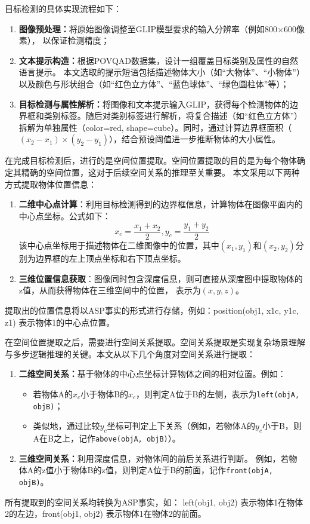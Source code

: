 目标检测的具体实现流程如下：
\begin{enumerate}[nosep] 
\item \textbf{图像预处理：}将原始图像调整至GLIP模型要求的输入分辨率（例如800$\times$600像素），
以保证检测精度； 
\item \textbf{文本提示构造：}根据POVQAD数据集，设计一组覆盖目标类别及属性的自然语言提示。
本文选取的提示短语包括描述物体大小（如“大物体”、“小物体”）以及颜色与形状组合（如“红色立方体”、“蓝色球体”、“绿色圆柱体”等）； 
\item \textbf{目标检测与属性解析：}将图像和文本提示输入GLIP，获得每个检测物体的边界框和类别标签。随后对类别标签进行解析，将复合描述（如“红色立方体”）拆解为单独属性（color=red, shape=cube）。同时，通过计算边界框面积（$(x_2 - x_1)\times(y_2 - y_1)$），结合预设阈值进一步推断物体的大小属性。 
\end{enumerate}

在完成目标检测后，进行的是空间位置提取。空间位置提取的目的是为每个物体确定其精确的空间位置，这对于后续空间关系的推理至关重要。
本文采用以下两种方式提取物体位置信息：
\begin{enumerate}[nosep]
\item \textbf{二维中心点计算}：利用目标检测得到的边界框信息，计算物体在图像平面内的中心点坐标。公式如下：
$$x_c = \frac{x_1+x_2}{2}, y_c = \frac{y_1 + y_2}{2}$$
该中心点坐标用于描述物体在二维图像中的位置，其中$(x_1,y_1)$和$(x_2,y_2)$分别为边界框的左上顶点坐标和右下顶点坐标。
\item \textbf{三维位置信息获取}：图像同时包含深度信息，则可直接从深度图中提取物体的z值，从而获得物体在三维空间中的位置，
表示为$(x, y, z)$。
\end{enumerate}
提取出的位置信息将以ASP事实的形式进行存储，例如：position(obj1, x1c, y1c, z1) 表示物体1的中心点位置。

在空间位置提取之后，需要进行空间关系提取。空间关系提取是实现复杂场景理解与多步逻辑推理的关键。本文从以下几个角度对空间关系进行提取：
\begin{enumerate}[nosep]
\item \textbf{二维空间关系：}基于物体的中心点坐标计算物体之间的相对位置。例如： 
    \begin{itemize}[leftmargin=2em] 
        \item 若物体A的$x_c$小于物体B的$x_c$，则判定A位于B的左侧，表示为\texttt{left(objA, objB)}； 
        \item 类似地，通过比较$y_c$坐标可判定上下关系（例如，若物体A的$y_c$小于B，则A在B之上，记作\texttt{above(objA, objB)}）。 
    \end{itemize} 
\item \textbf{三维空间关系：}利用深度信息，对物体间的前后关系进行判断。
例如，若物体A的z值小于物体B的z值，则判定A位于B的前面，记作\texttt{front(objA, objB)}。 
\end{enumerate}
所有提取到的空间关系均转换为ASP事实，如：
left(obj1, obj2) 表示物体1在物体2的左边，front(obj1, obj2) 表示物体1在物体2的前面。

